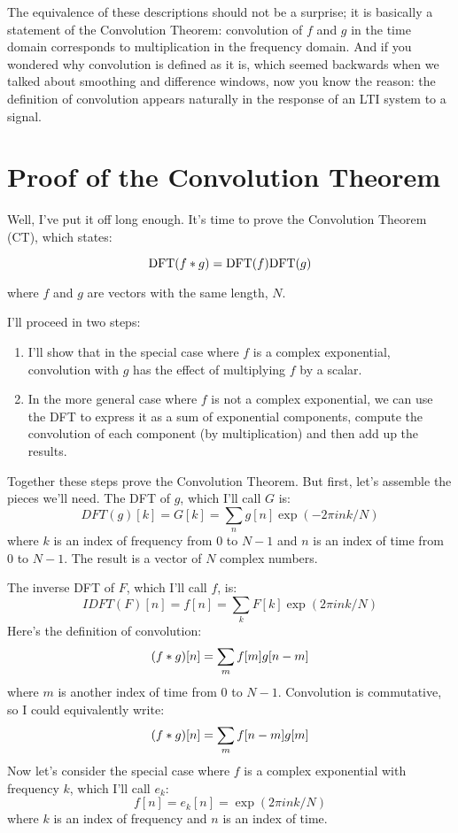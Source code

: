 The equivalence of these descriptions should not be a surprise;
it is basically a statement of the Convolution Theorem:
convolution of $f$ and $g$ in the time
domain corresponds to multiplication in the frequency domain.
And if you wondered why convolution is defined as it is, which
seemed backwards when we talked about smoothing and difference
windows, now you know the reason: the definition of convolution
appears naturally in the response of an LTI system to a signal.


\section{Proof of the Convolution Theorem}

Well, I've put it off long enough.  It's time to prove the Convolution
Theorem (CT), which states:

\[ \mathrm{DFT}(f \ast g) = \mathrm{DFT}(f) \mathrm{DFT}(g) \]

where $f$ and $g$ are vectors with the same length, $N$.

I'll proceed in two steps:

\begin{enumerate}
	
	\item I'll show that in the special case where $f$ is a complex
	exponential, convolution with $g$ has the effect of multiplying
	$f$ by a scalar.
	
	\item In the more general case where $f$ is not a complex exponential,
	we can use the DFT to express it as a sum of exponential components,
	compute the convolution of each component (by multiplication) and
	then add up the results.
	
\end{enumerate}

Together these steps prove the Convolution Theorem.  But first, let's
assemble the pieces we'll need.  The DFT of $g$, which I'll call $G$
is:
%
\[ DFT(g)[k] = G[k] = \sum_n g[n] \exp(-2 \pi i n k / N) \]
%
where $k$ is an index of frequency from
0 to $N-1$ and $n$ is an index of time from 0 to $N-1$.
The result is a vector of $N$ complex numbers.

The inverse DFT of $F$, which I'll call $f$, is:
%
\[ IDFT(F)[n] = f[n] = \sum_k F[k] \exp(2 \pi i n k / N) \]
%
Here's the definition of convolution:
%
\[ (f \ast g)[n] = \sum_m f[m] g[n-m] \]
%
where $m$ is another index of time from 0 to $N-1$.
Convolution is commutative, so I could equivalently write:
%
\[ (f \ast g)[n] = \sum_m f[n-m] g[m] \]
%
Now let's consider the special case where $f$ is a complex
exponential with frequency $k$, which I'll call $e_k$:
%
\[ f[n] = e_k[n] = \exp(2 \pi i n k / N) \]
%
where $k$ is an index of frequency and $n$ is an index of time.

